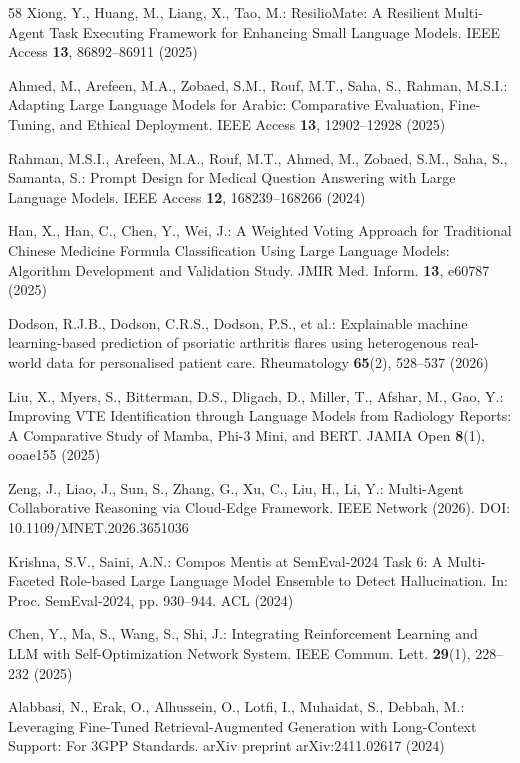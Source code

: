 \begin{thebibliography}{58}
Xiong, Y., Huang, M., Liang, X., Tao, M.: ResilioMate: A Resilient Multi-Agent Task Executing Framework for Enhancing Small Language Models. IEEE Access \textbf{13}, 86892--86911 (2025)

Ahmed, M., Arefeen, M.A., Zobaed, S.M., Rouf, M.T., Saha, S., Rahman, M.S.I.: Adapting Large Language Models for Arabic: Comparative Evaluation, Fine-Tuning, and Ethical Deployment. IEEE Access \textbf{13}, 12902--12928 (2025)

Rahman, M.S.I., Arefeen, M.A., Rouf, M.T., Ahmed, M., Zobaed, S.M., Saha, S., Samanta, S.: Prompt Design for Medical Question Answering with Large Language Models. IEEE Access \textbf{12}, 168239--168266 (2024)

Han, X., Han, C., Chen, Y., Wei, J.: A Weighted Voting Approach for Traditional Chinese Medicine Formula Classification Using Large Language Models: Algorithm Development and Validation Study. JMIR Med. Inform. \textbf{13}, e60787 (2025)

Dodson, R.J.B., Dodson, C.R.S., Dodson, P.S., et al.: Explainable machine learning-based prediction of psoriatic arthritis flares using heterogenous real-world data for personalised patient care. Rheumatology \textbf{65}(2), 528--537 (2026)

Liu, X., Myers, S., Bitterman, D.S., Dligach, D., Miller, T., Afshar, M., Gao, Y.: Improving VTE Identification through Language Models from Radiology Reports: A Comparative Study of Mamba, Phi-3 Mini, and BERT. JAMIA Open \textbf{8}(1), ooae155 (2025)

Zeng, J., Liao, J., Sun, S., Zhang, G., Xu, C., Liu, H., Li, Y.: Multi-Agent Collaborative Reasoning via Cloud-Edge Framework. IEEE Network (2026). DOI: 10.1109/MNET.2026.3651036

Krishna, S.V., Saini, A.N.: Compos Mentis at SemEval-2024 Task 6: A Multi-Faceted Role-based Large Language Model Ensemble to Detect Hallucination. In: Proc. SemEval-2024, pp. 930--944. ACL (2024) 

Chen, Y., Ma, S., Wang, S., Shi, J.: Integrating Reinforcement Learning and LLM with Self-Optimization Network System. IEEE Commun. Lett. \textbf{29}(1), 228--232 (2025)

Alabbasi, N., Erak, O., Alhussein, O., Lotfi, I., Muhaidat, S., Debbah, M.: Leveraging Fine-Tuned Retrieval-Augmented Generation with Long-Context Support: For 3GPP Standards. arXiv preprint arXiv:2411.02617 (2024)


\end{thebibliography}
